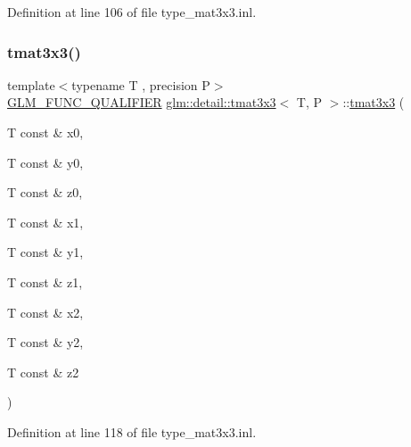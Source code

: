 Definition at line 106 of file type\+\_\+mat3x3.\+inl.

\mbox{\label{structglm_1_1detail_1_1tmat3x3_a879a2f7f841b7fc8c801d9bc3e0b272b}} 
\subsubsection{\texorpdfstring{tmat3x3()}{tmat3x3()}\hspace{0.1cm}{\footnotesize\ttfamily [6/22]}}
{\footnotesize\ttfamily template$<$typename T , precision P$>$ \\
\hyperlink{setup_8hpp_a33fdea6f91c5f834105f7415e2a64407}{G\+L\+M\+\_\+\+F\+U\+N\+C\+\_\+\+Q\+U\+A\+L\+I\+F\+I\+ER} \hyperlink{structglm_1_1detail_1_1tmat3x3}{glm\+::detail\+::tmat3x3}$<$ T, P $>$\+::\hyperlink{structglm_1_1detail_1_1tmat3x3}{tmat3x3} (\begin{DoxyParamCaption}\item[{T const \&}]{x0,  }\item[{T const \&}]{y0,  }\item[{T const \&}]{z0,  }\item[{T const \&}]{x1,  }\item[{T const \&}]{y1,  }\item[{T const \&}]{z1,  }\item[{T const \&}]{x2,  }\item[{T const \&}]{y2,  }\item[{T const \&}]{z2 }\end{DoxyParamCaption})}



Definition at line 118 of file type\+\_\+mat3x3.\+inl.

\mbox{\label{structglm_1_1detail_1_1tmat3x3_afcb075377787c4e8252bd0691658239e}} 
